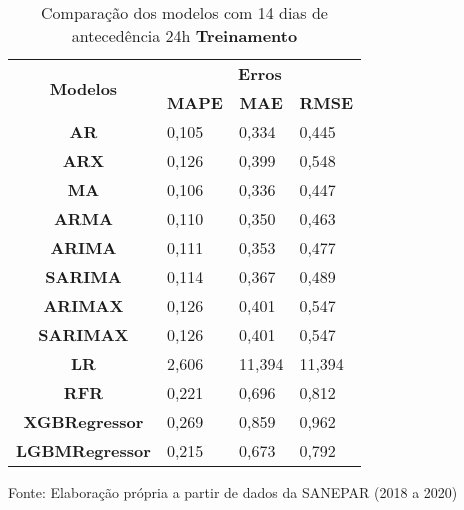\begin{table}[H]
	\centering
	\caption{Comparação dos modelos com 14 dias de antecedência 24h \textbf{Treinamento} }\label{tb:30-24trn}
	\begin{tabular}{@{}clll@{}}
		\toprule
		\multirow{2}{*}{\textbf{Modelos}} & \multicolumn{3}{c}{\textbf{Erros}}                                                                       \\ \cmidrule(l){2-4} 
		& \multicolumn{1}{c}{\textbf{MAPE}} & \multicolumn{1}{c}{\textbf{MAE}} & \multicolumn{1}{c}{\textbf{RMSE}} \\ \hline
\textbf{AR}                       & 0,105                             & 0,334                            & 0,445                             \\
\textbf{ARX}                      & 0,126                             & 0,399                            & 0,548                             \\
\textbf{MA}                       & 0,106                             & 0,336                            & 0,447                             \\
\textbf{ARMA}                     & 0,110                             & 0,350                            & 0,463                             \\
\textbf{ARIMA}                    & 0,111                             & 0,353                            & 0,477                             \\
\textbf{SARIMA}                   & 0,114                             & 0,367                            & 0,489                             \\
\textbf{ARIMAX}                   & 0,126                             & 0,401                            & 0,547                             \\
\textbf{SARIMAX}                  & 0,126                             & 0,401                            & 0,547                             \\
\textbf{LR}                       & 2,606                             & 11,394                           & 11,394                            \\
\textbf{RFR}                      & 0,221                             & 0,696                            & 0,812                             \\
\textbf{XGBRegressor}             & 0,269                             & 0,859                            & 0,962                             \\
\textbf{LGBMRegressor}            & 0,215                             & 0,673                            & 0,792                             \\ \bottomrule
	\end{tabular}

Fonte: Elaboração própria a partir de dados da SANEPAR (2018 a 2020)
\end{table}


